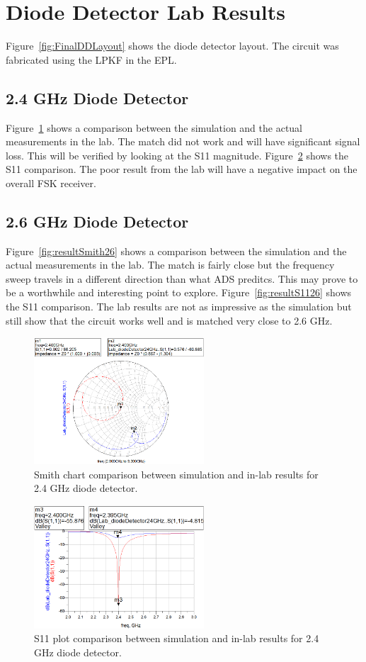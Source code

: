 \documentclass[conference]{IEEEtran}
\begin{document}
\section{Diode Detector Lab Results}
Figure~\ref{fig:FinalDDLayout} shows the diode detector layout.  The circuit was fabricated using the LPKF in the EPL.
\subsection{2.4 GHz Diode Detector}
Figure~\ref{fig:resultSmith24} shows a comparison between the simulation and the actual measurements in the lab.  The match did not work and will have significant signal loss.  This will be verified by looking at the S11 magnitude. Figure~\ref{fig:resultS1124} shows the S11 comparison.  The poor result from the lab will have a negative impact on the overall FSK receiver.
\subsection{2.6 GHz Diode Detector}
 Figure~\ref{fig:resultSmith26} shows a comparison between the simulation and the actual measurements in the lab.  The match is fairly close but the frequency sweep travels in a different direction than what ADS preditcs.  This may prove to be a worthwhile and interesting point to explore. Figure~\ref{fig:resultS1126} shows the S11 comparison.  The lab results are not as impressive as the simulation but still show that the circuit works well and is matched very close to 2.6 GHz.

\begin{figure}[!htb]
\centering
\includegraphics[width=2.5in]{diode-pics/diodedetectorLab24Smith.png}
\caption{Smith chart comparison between simulation and in-lab results for 2.4 GHz diode detector.}
\label{fig:resultSmith24}
\end{figure}

\begin{figure}[!htb]
\centering
\includegraphics[width=2.5in]{diode-pics/diodedetectorLab24S11.png}
\caption{S11 plot comparison between simulation and in-lab results for 2.4 GHz diode detector.}
\label{fig:resultS1124}
\end{figure}
\end{document}
